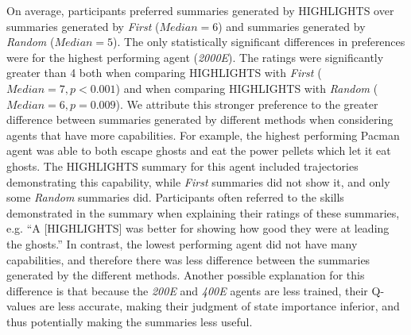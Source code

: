 On average, participants preferred summaries generated by HIGHLIGHTS over summaries generated by \emph{First} ($Median = 6$) and summaries generated by \emph{Random} ($Median = 5$). The only statistically significant differences in preferences were for the highest performing agent (\emph{2000E}). The ratings were significantly greater than 4 both when comparing HIGHLIGHTS with \emph{First} ($Median = 7, p<0.001$) and when comparing HIGHLIGHTS with \emph{Random} ($Median = 6, p=0.009$). We attribute this stronger preference to the greater difference between summaries generated by different methods when considering agents that have more capabilities. For example, the highest performing Pacman agent was able to both escape ghosts and eat the power pellets which let it eat ghosts. The HIGHLIGHTS summary for this agent included trajectories demonstrating this capability, while \emph{First} summaries did not show it, and only some \emph{Random} summaries did. Participants often referred to the skills demonstrated in the summary when explaining their ratings of these summaries, e.g. ``A [HIGHLIGHTS] was better for showing how good they were at leading the ghosts.'' In contrast, the lowest performing agent did not have many capabilities, and therefore there was less difference between the summaries generated by the different methods. Another possible explanation for this difference is that because the \emph{200E} and \emph{400E} agents are less trained, their Q-values are less accurate, making their judgment of state importance inferior, and thus potentially making the summaries less useful. 





